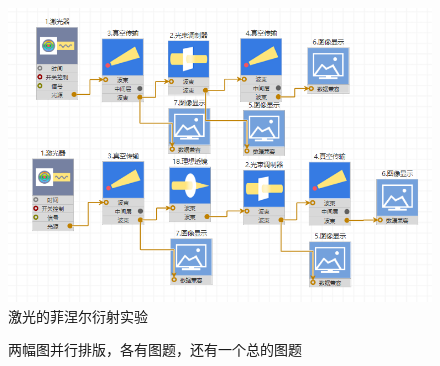 \documentclass[12pt,a4paper,UTF8]{ctexart}
\begin{document}

	\begin{figure}[htbp]
		\centering
		\includegraphics{img//2_2.png}
		\caption{激光的菲涅尔衍射实验}
	\end{figure}

	\begin{figure}[htbp]
		\centering
		\caption{两幅图并行排版，各有图题，还有一个总的图题}
		\label{fig:tcvi}
	\end{figure}
\end{document}
